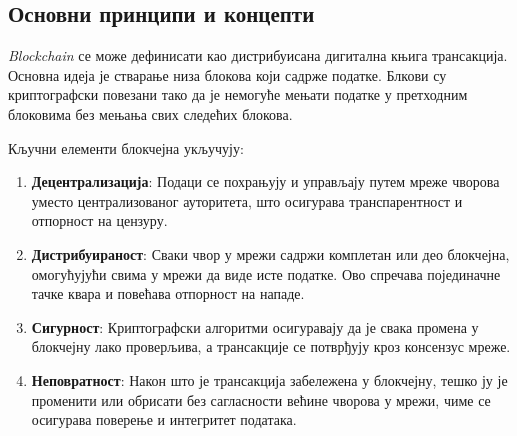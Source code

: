 \documentclass[12pt, a4paper]{article}
\begin{document}
\subsection{Основни принципи и концепти}
\textit{Blockchain} се може дефинисати као дистрибуисана дигитална књига трансакција. Основна идеја је стварање низа блокова који садрже податке. Блкови су криптографски повезани тако да је немогуће мењати податке у претходним блоковима без мењања свих следећих блокова. 

Кључни елементи блокчејна укључују:
\begin{enumerate}
    \item \textbf{Децентрализација}: Подаци се похрањују и управљају путем мреже чворова уместо централизованог ауторитета, што осигурава транспарентност и отпорност на цензуру.
    \item  \textbf{Дистрибуираност}: Сваки чвор у мрежи садржи комплетан или део блокчејна, омогућујући свима у мрежи да виде исте податке. Ово спречава појединачне тачке квара и повећава отпорност на нападе.
    \item \textbf{Сигурност}: Криптографски алгоритми осигуравају да је свака промена у блокчејну лако проверљива, а трансакције се потврђују кроз консензус мреже.
    \item \textbf{Неповратност}: Након што је трансакција забележена у блокчејну, тешко ју је променити или обрисати без сагласности већине чворова у мрежи, чиме се осигурава поверење и интегритет података.
\end{enumerate}
\end{document}
